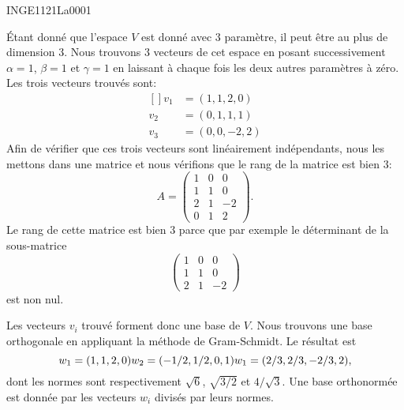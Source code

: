 

\begin{corrige}{INGE1121La0001}

	Étant donné que l'espace $V$ est donné avec $3$ paramètre, il peut être au plus de dimension $3$. Nous trouvons $3$ vecteurs de cet espace en posant successivement $\alpha=1$, $\beta=1$ et $\gamma=1$ en laissant à chaque fois les deux autres paramètres à zéro. Les trois vecteurs trouvés sont:
	\begin{equation}
		\begin{aligned}[]
			v_1&=(1,1,2,0)\\
			v_2&=(0,1,1,1)\\
			v_3&=(0,0,-2,2)
		\end{aligned}
	\end{equation}
	Afin de vérifier que ces trois vecteurs sont linéairement indépendants, nous les mettons dans une matrice et nous vérifions que le rang de la matrice est bien $3$:
	\begin{equation}
		A=\begin{pmatrix}
			1	&	0	&	0	\\
			1	&	1	&	0	\\
			2	&	1	&	-2	\\
			0	&	1	&	2
		\end{pmatrix}.
	\end{equation}
	Le rang de cette matrice est bien $3$ parce que par exemple le déterminant de la sous-matrice
	\begin{equation}
		\begin{pmatrix}
			1	&	0	&	0	\\
			1	&	1	&	0	\\
			2	&	1	&	-2
		\end{pmatrix}
	\end{equation}
	est non nul.

	Les vecteurs $v_i$ trouvé forment donc une base de $V$. Nous trouvons une base orthogonale en appliquant la méthode de Gram-Schmidt. Le résultat est
	\begin{equation}
		w_1=(1,1,2,0)\\
		w_2=(-1/2,1/2,0,1)\\
		w_1=(2/3,2/3,-2/3,2),
	\end{equation}
	dont les normes sont respectivement $\sqrt{6}$, $\sqrt{3/2}$ et $4/\sqrt{3}$. Une base orthonormée est donnée par les vecteurs $w_i$ divisés par leurs normes.

\end{corrige}
